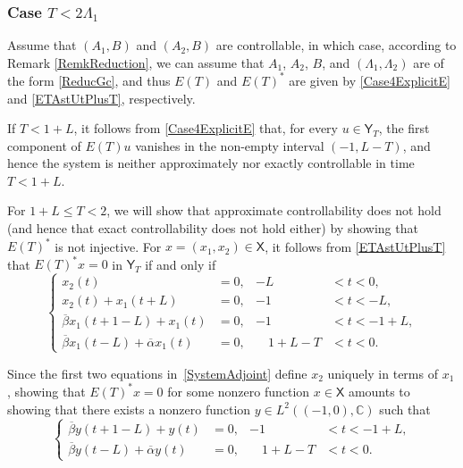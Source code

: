 \documentclass[10pt]{amsart}
\theoremstyle{plain}
\theoremstyle{definition}
\begin{document}
\subsubsection{\texorpdfstring{Case $T < 2 \Lambda_1$}{Case T < 2 Lambda1}}

Assume that $(A_1, B)$ and $(A_2, B)$ are controllable, in which case, according to Remark \ref{RemkReduction}, we can assume that $A_1$, $A_2$, $B$, and $(\Lambda_1, \Lambda_2)$ are of the form \eqref{ReducGc}, and thus $E(T)$ and $E(T)^\ast$ are given by \eqref{Case4ExplicitE} and \eqref{ETAstUtPlusT}, respectively.

If $T < 1 + L$, it follows from \eqref{Case4ExplicitE} that, for every $u \in \mathsf Y_T$, the first component of $E(T) u$ vanishes in the non-empty interval $(-1, L - T)$, and hence the system is neither approximately nor exactly controllable in time $T < 1 + L$.

For $1 + L \leq T < 2$, we will show that approximate controllability does not hold (and hence that exact controllability does not hold either) by showing that $E(T)^\ast$ is not injective. For $x = (x_1, x_2) \in \mathsf X$, it follows from \eqref{ETAstUtPlusT} that $E(T)^\ast x = 0$ in $\mathsf Y_T$ if and only if
\begin{equation}
\label{SystemAdjoint}
\left\{
\begin{aligned}
x_2(t) & = 0, & -L & < t < 0, \\
x_2(t) + x_1(t + L) & = 0, & -1 & < t < -L, \\
\overline\beta x_1(t + 1 - L) + x_1(t) & = 0, & -1 & < t < -1 + L, \\
\overline\beta x_1(t - L) + \overline\alpha x_1(t) & = 0, & \quad 1 + L - T & < t < 0.
\end{aligned}
\right.
\end{equation}

Since the first two equations in~\eqref{SystemAdjoint} define $x_2$ uniquely in terms of $x_1$, showing that $E(T)^\ast x = 0$ for some nonzero function $x \in \mathsf X$ amounts to showing that there exists a nonzero function $y \in L^2((-1, 0), \mathbb C)$ such that
\begin{equation}
\label{EquationV}
\left\{
\begin{aligned}
\overline\beta y(t + 1 - L) + y(t) & = 0, & -1 & < t < -1 + L, \\
\overline\beta y(t - L) + \overline\alpha y(t) & = 0, & \quad 1 + L - T & < t < 0.
\end{aligned}
\right.
\end{equation}
\end{document}
